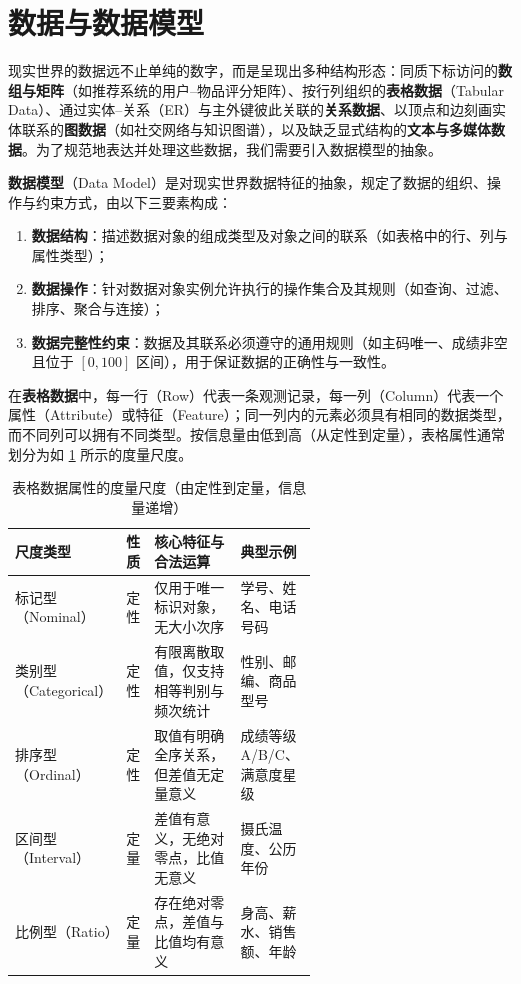 \section{数据与数据模型}\label{sec:data-model}

现实世界的数据远不止单纯的数字，而是呈现出多种结构形态：同质下标访问的\textbf{数组与矩阵}（如推荐系统的用户–物品评分矩阵）、按行列组织的\textbf{表格数据}（Tabular Data）、通过实体–关系（ER）与主外键彼此关联的\textbf{关系数据}、以顶点和边刻画实体联系的\textbf{图数据}（如社交网络与知识图谱），以及缺乏显式结构的\textbf{文本与多媒体数据}。为了规范地表达并处理这些数据，我们需要引入数据模型的抽象。

\begin{definition}[数据模型三要素]\label{def:data-model}
\textbf{数据模型}（Data Model）是对现实世界数据特征的抽象，规定了数据的组织、操作与约束方式，由以下三要素构成：
\begin{enumerate}
  \item \textbf{数据结构}：描述数据对象的组成类型及对象之间的联系（如表格中的行、列与属性类型）；
  \item \textbf{数据操作}：针对数据对象实例允许执行的操作集合及其规则（如查询、过滤、排序、聚合与连接）；
  \item \textbf{数据完整性约束}：数据及其联系必须遵守的通用规则（如主码唯一、成绩非空且位于 $[0,100]$ 区间），用于保证数据的正确性与一致性。
\end{enumerate}
\end{definition}

在\textbf{表格数据}中，每一行（Row）代表一条观测记录，每一列（Column）代表一个属性（Attribute）或特征（Feature）；同一列内的元素必须具有相同的数据类型，而不同列可以拥有不同类型。按信息量由低到高（从定性到定量），表格属性通常划分为如 \cref{tab:attribute-scales} 所示的度量尺度。

\begin{table}[htbp]
  \centering\small
  \caption{表格数据属性的度量尺度（由定性到定量，信息量递增）}\label{tab:attribute-scales}
  \begin{tabular}{@{}ll>{\raggedright\arraybackslash}p{0.34\linewidth}>{\raggedright\arraybackslash}p{0.26\linewidth}@{}}
    \toprule
    尺度类型 & 性质 & 核心特征与合法运算 & 典型示例 \\
    \midrule
    标记型（Nominal） & 定性 & 仅用于唯一标识对象，无大小次序 & 学号、姓名、电话号码 \\
    类别型（Categorical） & 定性 & 有限离散取值，仅支持相等判别与频次统计 & 性别、邮编、商品型号 \\
    排序型（Ordinal） & 定性 & 取值有明确全序关系，但差值无定量意义 & 成绩等级 A/B/C、满意度星级 \\
    区间型（Interval） & 定量 & 差值有意义，无绝对零点，比值无意义 & 摄氏温度、公历年份 \\
    比例型（Ratio） & 定量 & 存在绝对零点，差值与比值均有意义 & 身高、薪水、销售额、年龄 \\
    \bottomrule
  \end{tabular}
\end{table}

